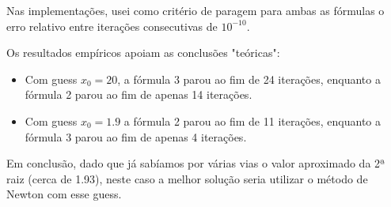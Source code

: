 \documentclass{mnum}
\begin{document}
Nas implementações, usei como critério de paragem para ambas as fórmulas o erro relativo entre iterações consecutivas de $10^{-10}$.

Os resultados empíricos apoiam as conclusões "teóricas":
\begin{itemize}
    \item Com guess $x_0=20$, a fórmula 3 parou ao fim de 24 iterações, enquanto a fórmula 2 parou ao fim de apenas 14 iterações.
    \item Com guess $x_0=1.9$ a fórmula 2 parou ao fim de 11 iterações, enquanto a fórmula 3 parou ao fim de apenas 4 iterações.
\end{itemize}
Em conclusão, dado que já sabíamos por várias vias o valor aproximado da 2ª raiz (cerca de 1.93), neste caso a melhor solução seria utilizar o método de Newton com esse guess.
\end{document}
